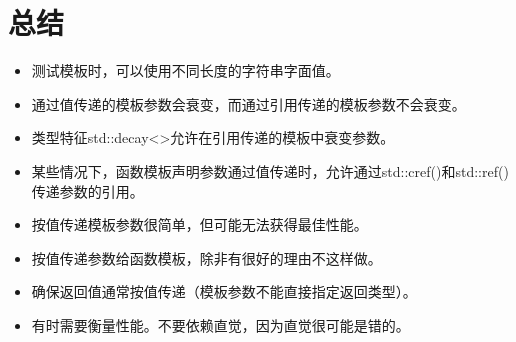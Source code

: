 \section{总结}

\begin{itemize}
\item 
测试模板时，可以使用不同长度的字符串字面值。

\item 
通过值传递的模板参数会衰变，而通过引用传递的模板参数不会衰变。

\item 
类型特征std::decay<>允许在引用传递的模板中衰变参数。

\item 
某些情况下，函数模板声明参数通过值传递时，允许通过std::cref()和std::ref()传递参数的引用。

\item 
按值传递模板参数很简单，但可能无法获得最佳性能。

\item 
按值传递参数给函数模板，除非有很好的理由不这样做。

\item 
确保返回值通常按值传递（模板参数不能直接指定返回类型）。

\item 
有时需要衡量性能。不要依赖直觉，因为直觉很可能是错的。
\end{itemize}